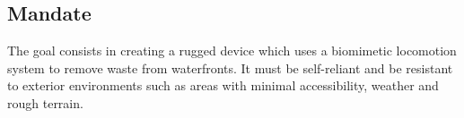 

\subsection{Mandate}

The goal consists in creating a rugged device which uses a biomimetic locomotion system to remove waste from waterfronts. It must be self-reliant and be resistant to exterior environments such as areas with minimal accessibility, weather and rough terrain.

